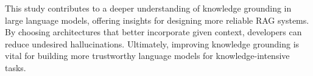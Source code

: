 This study contributes to a deeper understanding of knowledge grounding in large language models, offering insights for designing more reliable RAG systems.
By choosing architectures that better incorporate given context, developers can reduce undesired hallucinations.
Ultimately, improving knowledge grounding is vital for building more trustworthy language models for knowledge-intensive tasks.
